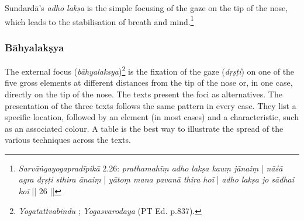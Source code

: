 Sundardā's \textit{adho lakṣa} is the simple focusing of the gaze on the tip of the nose, which leads to the stabilisation of breath and mind.\footnote{\textit{Sarvāṅgayogapradīpikā} 2.26: \textit{prathamahīṃ adho lakṣa kauṃ jānaiṃ} | \textit{nāśā agra dṛṣṭi sthira ānaiṃ} | \textit{yātoṃ mana pavanā thira hoī} | \textit{adho lakṣa jo sādhai koī} || 26 ||}\\

\subsubsection{Bāhyalakṣya}
The external focus (\textit{bāhyalaksya})\footnote{\textit{Yogatattvabindu} ; \textit{Yogasvarodaya} (PT Ed. p.837).} is the fixation of the gaze (\textit{dṛṣṭi}) on one of the five gross elements at different distances from the tip of the nose or, in one case, directly on the tip of the nose. The texts present the foci as alternatives. The presentation of the three texts follows the same pattern in every case. They list a specific location, followed by an element (in most cases) and a characteristic, such as an associated colour. A table is the best way to illustrate the spread of the various techniques across the texts.
